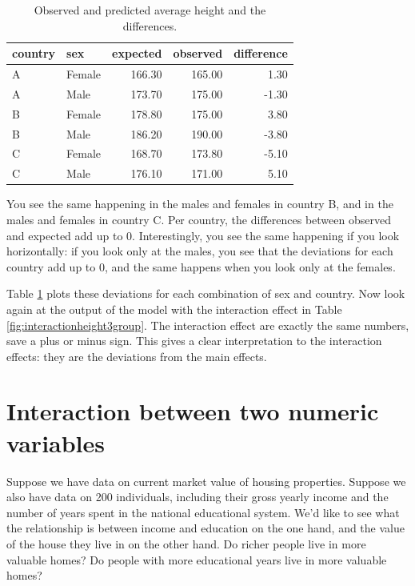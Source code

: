 \documentclass[]{book}\usepackage[]{graphicx}\usepackage[]{color}
\begin{document}
\begin{table}[ht]
\centering
\caption{Observed and predicted average height and the differences.} 
\label{tab:country_sex5}
\begin{tabular}{llrrr}
  \hline
country & sex & expected & observed & difference \\ 
  \hline
A & Female & 166.30 & 165.00 & 1.30 \\ 
  A & Male & 173.70 & 175.00 & -1.30 \\ 
  B & Female & 178.80 & 175.00 & 3.80 \\ 
  B & Male & 186.20 & 190.00 & -3.80 \\ 
  C & Female & 168.70 & 173.80 & -5.10 \\ 
  C & Male & 176.10 & 171.00 & 5.10 \\ 
   \hline
\end{tabular}
\end{table}




You see the same happening in the males and females in country B, and in the males and females in country C. Per country, the differences between observed and expected add up to 0. Interestingly, you see the same happening if you look horizontally: if you look only at the males, you see that the deviations for each country add up to 0, and the same happens when you look only at the females. 

Table \ref{tab:country_sex5} plots these deviations for each combination of sex and country. Now look again at the output of the model with the interaction effect in Table \ref{fig:interactionheight3group}. The interaction effect are exactly the same numbers, save a plus or minus sign. This gives a clear interpretation to the interaction effects: they are the deviations from the main effects. 










\section{Interaction between two numeric variables}

Suppose we have data on current market value of housing properties. Suppose we also have data on 200 individuals, including their gross yearly income and the number of years spent in the national educational system. We'd like to see what the relationship is between income and education on the one hand, and the value of the house they live in on the other hand. Do richer people live in more valuable homes? Do people with more educational years live in more valuable homes? 
\end{document}
